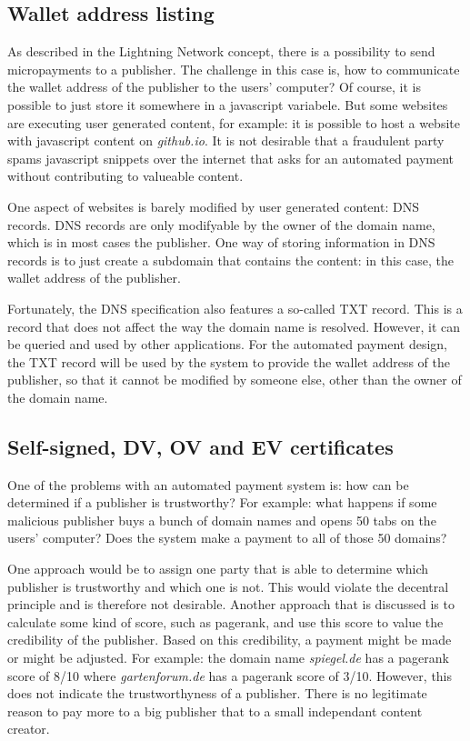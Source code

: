 \subsection{Wallet address listing}

As described in the Lightning Network concept, there is a possibility to send micropayments to a publisher. The challenge in this case is, how to communicate the wallet address of the publisher to the users' computer? Of course, it is possible to just store it somewhere in a javascript variabele. But some websites are executing user generated content, for example: it is possible to host a website with javascript content on \textit{github.io}. It is not desirable that a fraudulent party spams javascript snippets over the internet that asks for an automated payment without contributing to valueable content. 

One aspect of websites is barely modified by user generated content: DNS records. DNS records are only modifyable by the owner of the domain name, which is in most cases the publisher. One way of storing information in DNS records is to just create a subdomain that contains the content: in this case, the wallet address of the publisher. 

Fortunately, the DNS specification also features a so-called TXT record. This is a record that does not affect the way the domain name is resolved. However, it can be queried and used by other applications. For the automated payment design, the TXT record will be used by the system to provide the wallet address of the publisher, so that it cannot be modified by someone else, other than the owner of the domain name. 

\subsection{Self-signed, DV, OV and EV certificates}

One of the problems with an automated payment system is: how can be determined if a publisher is trustworthy? For example: what happens if some malicious publisher buys a bunch of domain names and opens 50 tabs on the users' computer? Does the system make a payment to all of those 50 domains? 

One approach would be to assign one party that is able to determine which publisher is trustworthy and which one is not. This would violate the decentral principle and is therefore not desirable. Another approach that is discussed is to calculate some kind of score, such as pagerank, and use this score to value the credibility of the publisher. Based on this credibility, a payment might be made or might be adjusted. For example: the domain name \textit{spiegel.de} has a pagerank score of 8/10 where \textit{gartenforum.de} has a pagerank score of 3/10. However, this does not indicate the trustworthyness of a publisher. There is no legitimate reason to pay more to a big publisher that to a small independant content creator. 

